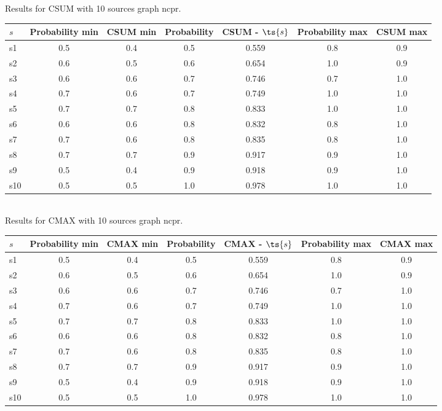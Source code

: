 \documentclass{article}
\begin{document}
\noindent Results for CSUM with 10 sources graph ncpr.

\noindent\begin{tabular}{|l|c|c|c|c|c|c|}
\hline
$s$& Probability min & CSUM min & Probability & CSUM - $\ts{s}$ & Probability max & CSUM max\\
\hline
s1 &0.5 & 0.4 & 0.5 & 0.559 & 0.8 & 0.9\\
\hline
s2 &0.6 & 0.5 & 0.6 & 0.654 & 1.0 & 0.9\\
\hline
s3 &0.6 & 0.6 & 0.7 & 0.746 & 0.7 & 1.0\\
\hline
s4 &0.7 & 0.6 & 0.7 & 0.749 & 1.0 & 1.0\\
\hline
s5 &0.7 & 0.7 & 0.8 & 0.833 & 1.0 & 1.0\\
\hline
s6 &0.6 & 0.6 & 0.8 & 0.832 & 0.8 & 1.0\\
\hline
s7 &0.7 & 0.6 & 0.8 & 0.835 & 0.8 & 1.0\\
\hline
s8 &0.7 & 0.7 & 0.9 & 0.917 & 0.9 & 1.0\\
\hline
s9 &0.5 & 0.4 & 0.9 & 0.918 & 0.9 & 1.0\\
\hline
s10 &0.5 & 0.5 & 1.0 & 0.978 & 1.0 & 1.0\\
\hline
\end{tabular}\\

\noindent Results for CMAX with 10 sources graph ncpr.

\noindent\begin{tabular}{|l|c|c|c|c|c|c|}
\hline
$s$& Probability min & CMAX min & Probability & CMAX - $\ts{s}$ & Probability max & CMAX max\\
\hline
s1 &0.5 & 0.4 & 0.5 & 0.559 & 0.8 & 0.9\\
\hline
s2 &0.6 & 0.5 & 0.6 & 0.654 & 1.0 & 0.9\\
\hline
s3 &0.6 & 0.6 & 0.7 & 0.746 & 0.7 & 1.0\\
\hline
s4 &0.7 & 0.6 & 0.7 & 0.749 & 1.0 & 1.0\\
\hline
s5 &0.7 & 0.7 & 0.8 & 0.833 & 1.0 & 1.0\\
\hline
s6 &0.6 & 0.6 & 0.8 & 0.832 & 0.8 & 1.0\\
\hline
s7 &0.7 & 0.6 & 0.8 & 0.835 & 0.8 & 1.0\\
\hline
s8 &0.7 & 0.7 & 0.9 & 0.917 & 0.9 & 1.0\\
\hline
s9 &0.5 & 0.4 & 0.9 & 0.918 & 0.9 & 1.0\\
\hline
s10 &0.5 & 0.5 & 1.0 & 0.978 & 1.0 & 1.0\\
\hline
\end{tabular}\\
\end{document}
